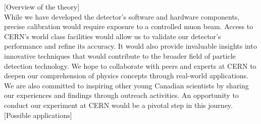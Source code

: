 [Overview of the theory] \\ 

While we have developed the detector’s software and hardware components, precise calibration would require exposure to a controlled muon beam. Access to CERN’s world class facilities would allow us to validate our detector’s performance and refine its accuracy. It would also provide invaluable insights into innovative techniques that would contribute to the broader field of particle detection technology. We hope to collaborate with peers and experts at CERN to deepen our comprehension of physics concepts through real-world applications. We are also committed to inspiring other young Canadian scientists by sharing our experiences and findings through outreach activities. An opportunity to conduct our experiment at CERN would be a pivotal step in this journey. \\ 

[Possible applications]
